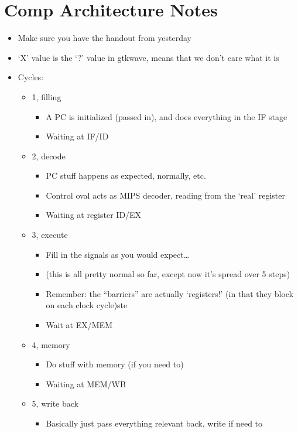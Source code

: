 \documentclass{article}
\begin{document}
\section*{﻿Comp Architecture Notes}
\begin{itemize}
\item  Make sure you have the handout from yesterday
\item  ‘X’ value is the ‘?’ value in gtkwave, means that we don’t care what it is
\item  Cycles:
\begin{itemize}
\item  1, filling
\begin{itemize}
\item  A PC is initialized (passed in), and does everything in the IF stage
\item  Waiting at IF/ID
\end{itemize}
\item  2, decode
\begin{itemize}
\item  PC stuff happens as expected, normally, etc.
\item  Control oval acts as MIPS decoder, reading from the ‘real’ register
\item  Waiting at register ID/EX
\end{itemize}
\item  3, execute
\begin{itemize}
\item  Fill in the signals as you would expect…
\item  (this is all pretty normal so far, except now it’s spread over 5 steps)
\item  Remember: the “barriers” are actually ‘registers!’ (in that they block on each clock cycle)ste
\item  Wait at EX/MEM
\end{itemize}
\item  4, memory
\begin{itemize}
\item  Do stuff with memory (if you need to)
\item  Waiting at MEM/WB
\end{itemize}
\item  5, write back
\begin{itemize}
\item  Basically just pass everything relevant back, write if need to
\end{itemize}
\end{itemize}

\end{itemize}
\end{document}
